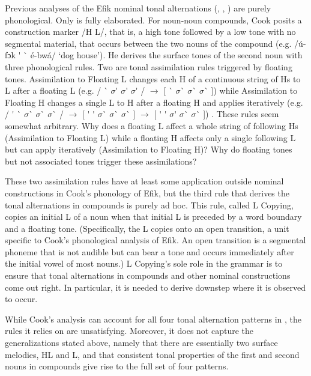 \documentclass[output=paper]{langscibook}
\begin{document}
Previous analyses of the Efik nominal tonal alternations (\citealt{Welmers1973}, \citealt{Kim1974}, \citealt{Cook1985}) are purely phonological. Only \citealt{Cook1985} is fully elaborated. For noun-noun compounds, Cook posits a construction marker /H L/, that is, a high tone followed by a low tone with no segmental material, that occurs between the two nouns of the compound (e.g. /ú-fɔk  \'{}   \`{}  é-bwá/ ‘dog house’). He derives the surface tones of the second noun with three phonological rules. Two are tonal assimilation rules triggered by floating tones. Assimilation to Floating L changes each H of a continuous string of Hs to L after a floating L (e.g. /  \`{}  ${\sigma}$\'{}  ${\sigma}$\'{}  ${\sigma}$\'{} / ${\rightarrow}$ [  \`{}  ${\sigma}$\`{}  ${\sigma}$\`{}  ${\sigma}$\`{}  ]) while Assimilation to Floating H changes a single L to H after a floating H and applies iteratively (e.g. /  \'{}   \`{}  ${\sigma}$\`{}  ${\sigma}$\`{}  ${\sigma}$\`{} / ${\rightarrow}$ [  \'{}   \'{}  ${\sigma}$\`{}  ${\sigma}$\`{}  ${\sigma}$\`{}  ] ${\rightarrow}$ [  \'{}   \'{}  ${\sigma}$\'{}  ${\sigma}$\`{}  ${\sigma}$\`{}  ]) \citep[193]{Cook1985}. These rules seem somewhat arbitrary. Why does a floating L affect a whole string of following Hs (Assimilation to Floating L) while a floating H affects only a single following L but can apply iteratively (Assimilation to Floating H)? Why do floating tones but not associated tones trigger these assimilations? 

These two assimilation rules have at least some application outside nominal constructions in Cook’s phonology of Efik, but the third rule that derives the tonal alternations in compounds is purely ad hoc. This rule, called L Copying, copies an initial L of a noun when that initial L is preceded by a word boundary and a floating tone. (Specifically, the L copies onto an open transition, a unit specific to Cook’s phonological analysis of Efik. An open transition is a segmental phoneme that is not audible but can bear a tone and occurs immediately after the initial vowel of most nouns.) L Copying’s sole role in the grammar is to ensure that tonal alternations in compounds and other nominal constructions come out right. In particular, it is needed to derive downstep where it is observed to occur. 

While Cook’s analysis can account for all four tonal alternation patterns in , the rules it relies on are unsatisfying. Moreover, it does not capture the generalizations stated above, namely that there are essentially two surface melodies, HL and L, and that consistent tonal properties of the first and second nouns in compounds give rise to the full set of four patterns. 
\end{document}
